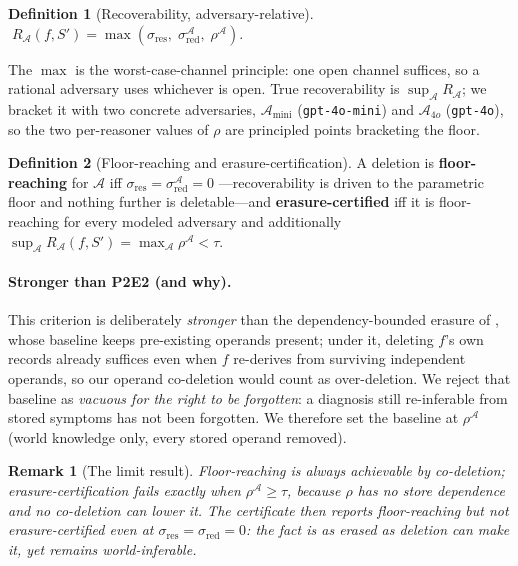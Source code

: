 \documentclass[10pt,twocolumn,letterpaper]{article}
\theoremstyle{definition}
\newtheorem{definition}{Definition}
\theoremstyle{plain}
\newtheorem{remark}{Remark}
\newcommand{\sres}{\sigma_{\mathrm{res}}}
\newcommand{\sred}{\sigma_{\mathrm{red}}}
\newcommand{\Rec}{R}
\newcommand{\Adv}{\mathcal{A}}
\newcommand{\code}[1]{\texttt{#1}}
\begin{document}
\begin{definition}[Recoverability, adversary-relative]\label{def:rec}
$\;\Rec_{\Adv}(f,S')=\max\!\left(\sres,\;\sred^{\Adv},\;\rho^{\Adv}\right).$
\end{definition}

The $\max$ is the worst-case-channel principle: one open channel suffices, so a
rational adversary uses whichever is open. True recoverability is
$\sup_{\Adv}\Rec_{\Adv}$; we bracket it with two concrete adversaries,
$\Adv_{\text{mini}}$ (\code{gpt-4o-mini}) and $\Adv_{4o}$ (\code{gpt-4o}), so the
two per-reasoner values of $\rho$ are principled points bracketing the floor.

\begin{definition}[Floor-reaching and erasure-certification]\label{def:cert}
A deletion is \textbf{floor-reaching} for $\Adv$ iff $\sres=\sred^{\Adv}=0$
---recoverability is driven to the parametric floor and nothing further is
deletable---and \textbf{erasure-certified} iff it is floor-reaching for every
modeled adversary and additionally
$\sup_{\Adv}\Rec_{\Adv}(f,S')=\max_{\Adv}\rho^{\Adv}<\tau$.
\end{definition}

\paragraph{Stronger than P2E2 (and why).}
This criterion is deliberately \emph{stronger} than the dependency-bounded erasure
of \citet{p2e2}, whose baseline keeps pre-existing operands present; under it,
deleting $f$'s own records already suffices even when $f$ re-derives from surviving
independent operands, so our operand co-deletion would count as over-deletion. We
reject that baseline as \emph{vacuous for the right to be forgotten}: a diagnosis
still re-inferable from stored symptoms has not been forgotten. We therefore set
the baseline at $\rho^{\Adv}$ (world knowledge only, every stored operand removed).

\begin{remark}[The limit result]\label{rmk:limit}
Floor-reaching is \emph{always} achievable by co-deletion; erasure-certification
fails exactly when $\rho^{\Adv}\geq\tau$, because $\rho$ has no store dependence
and no co-deletion can lower it. The certificate then reports \emph{floor-reaching
but not erasure-certified} even at $\sres=\sred=0$: the fact is as erased as
deletion can make it, yet remains world-inferable.
\end{remark}
\end{document}
